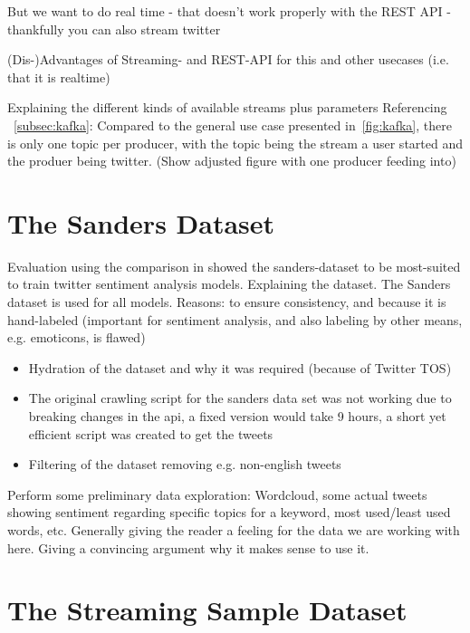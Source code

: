 But we want to do real time - that doesn't work properly with the REST API
- thankfully you can also stream twitter

(Dis-)Advantages of Streaming- and REST-API for this and other usecases (i.e. that it is realtime)

Explaining the different kinds of available streams plus parameters
Referencing ~\ref{subsec:kafka}: Compared to the general use case presented in~\ref{fig:kafka},
there is only one topic per producer, with the topic being the stream a user started and the produer being twitter.
(Show adjusted figure with one producer feeding into)

\section{The Sanders Dataset}
\label{sec:theSandersDataset}

Evaluation using the comparison in \cite{Saif2013} showed the sanders-dataset \cite{sanders} to be most-suited to train twitter sentiment analysis models.
Explaining the dataset.
The Sanders dataset is used for all models.
Reasons: to ensure consistency, and because it is hand-labeled (important for sentiment analysis, and also labeling by other means, e.g. emoticons, is flawed)

\begin{itemize}
    \item
    Hydration of the dataset and why it was required (because of Twitter TOS)
    \item
    The original crawling script for the sanders data set was not working due to breaking changes in the api, a fixed version would take 9 hours, a short yet efficient script was created to get the tweets
    \item
    Filtering of the dataset removing e.g. non-english tweets
\end{itemize}

Perform some preliminary data exploration: Wordcloud, some actual tweets showing sentiment regarding specific topics for a keyword, most used/least used words, etc.
Generally giving the reader a feeling for the data we are working with here.
Giving a convincing argument why it makes sense to use it.

\section{The Streaming Sample Dataset}
\label{sec:streamingSampleDataset}


